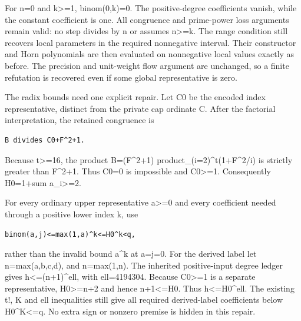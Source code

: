 For n=\allowbreak{}0 and k\textgreater{}\allowbreak{}=\allowbreak{}1, binom(0,k)=\allowbreak{}0. The positive-degree coefficients vanish, while the constant coefficient is one. All congruence and prime-power loss arguments remain valid: no step divides by n or assumes n\textgreater{}\allowbreak{}=\allowbreak{}k. The range condition still recovers local parameters in the required nonnegative interval. Their constructor and Horn polynomials are then evaluated on nonnegative local values exactly as before. The precision and unit-weight flow argument are unchanged, so a finite refutation is recovered even if some global representative is zero.



The radix bounds need one explicit repair. Let C0 be the encoded index representative, distinct from the private cap ordinate C. After the factorial interpretation, the retained congruence is



\begin{verbatim}
B divides C0+F^2+1.
\end{verbatim}

Because t\textgreater{}\allowbreak{}=\allowbreak{}16, the product B=\allowbreak{}(F\textasciicircum{}\allowbreak{}2+\allowbreak{}1) product\_\allowbreak{}(i=\allowbreak{}2)\textasciicircum{}\allowbreak{}t(1+\allowbreak{}F\textasciicircum{}\allowbreak{}2/\allowbreak{}i) is strictly greater than F\textasciicircum{}\allowbreak{}2+\allowbreak{}1. Thus C0=\allowbreak{}0 is impossible and C0\textgreater{}\allowbreak{}=\allowbreak{}1. Consequently H0=\allowbreak{}1+\allowbreak{}sum a\_\allowbreak{}i\textgreater{}\allowbreak{}=\allowbreak{}2.



For every ordinary upper representative a\textgreater{}\allowbreak{}=\allowbreak{}0 and every coefficient needed through a positive lower index k, use



\begin{verbatim}
binom(a,j)<=max(1,a)^k<=H0^k<q,
\end{verbatim}

rather than the invalid bound a\textasciicircum{}\allowbreak{}k at a=\allowbreak{}j=\allowbreak{}0. For the derived label let n=\allowbreak{}max(a,b,c,d), and n\textasteriskcentered{}\allowbreak{}=\allowbreak{}max(1,n). The inherited positive-input degree ledger gives h\textless{}\allowbreak{}=\allowbreak{}(n\textasteriskcentered{}\allowbreak{}+\allowbreak{}1)\textasciicircum{}\allowbreak{}ell, with ell=\allowbreak{}4194304. Because C0\textgreater{}\allowbreak{}=\allowbreak{}1 is a separate representative, H0\textgreater{}\allowbreak{}=\allowbreak{}n+\allowbreak{}2 and hence n\textasteriskcentered{}\allowbreak{}+\allowbreak{}1\textless{}\allowbreak{}=\allowbreak{}H0. Thus h\textless{}\allowbreak{}=\allowbreak{}H0\textasciicircum{}\allowbreak{}ell. The existing t!, K and ell inequalities still give all required derived-label coefficients below H0\textasciicircum{}\allowbreak{}K\textless{}\allowbreak{}=\allowbreak{}q. No extra sign or nonzero premise is hidden in this repair.



